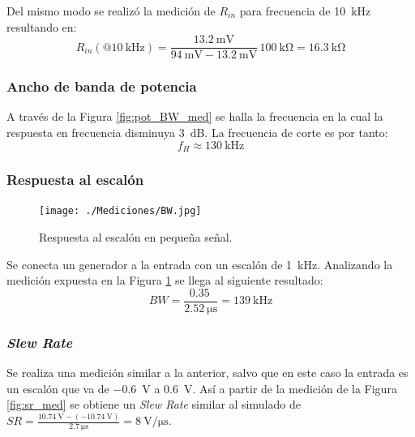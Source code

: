 		Del mismo modo se realizó la medición de $R_{in}$ para frecuencia de \SI{10}{\kHz} resultando en:
		\begin{equation*}
			R_{in}(@\SI{10}{\kHz})  = \frac{\SI{13.2}{\mV}}{\SI{94}{\mV} - \SI{13.2}{\mV}} \, \SI{100}{\kilo\ohm} = \boxed{\SI{16.3}{\kilo\ohm}}
		\end{equation*}
		\subsubsection{Ancho de banda de potencia}

		
		A través de la Figura \ref{fig:pot_BW_med} se halla la frecuencia en la cual la respuesta en frecuencia disminuya \SI{3}{\dB}. La frecuencia de corte es por tanto:
		\begin{equation*}
			\boxed{f_H \approx \SI{130}{\kHz}}
		\end{equation*}

		\subsubsection{Respuesta al escalón}
		\begin{figure}[h!]
			\centering
			\texttt{[image: ./Mediciones/BW.jpg]}
			\caption{Respuesta al escalón en pequeña señal.}
			\label{fig:escalon_ss}
		\end{figure}


		Se conecta un generador a la entrada con un escalón de \SI{1}{\kHz}. Analizando la medición expuesta en la Figura \ref{fig:escalon_ss} se llega al siguiente resultado:
		\begin{equation*}
			\boxed{BW = \frac{\SI{0.35}{}}{\SI{2.52}{\micro\second}} = \SI{139}{\kHz}}
		\end{equation*}

		\subsubsection{\emph{Slew Rate}}
		Se realiza una medición similar a la anterior, salvo que en este caso la entrada es un escalón que va de \SI{-.6}{\V} a \SI{.6}{\V}. Así a partir de la medición de la Figura \ref{fig:sr_med} se obtiene un \emph{Slew Rate} similar al simulado de $\boxed{SR = \frac{\SI{10.74}{\V}-(\SI{-10.74}{\V})}{\SI{2.7}{\micro\second}} = \SI{8}{\V\per\micro\second}}$.

